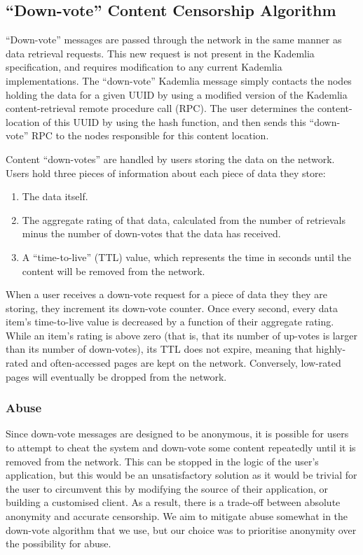 \subsection{``Down-vote'' Content Censorship Algorithm}

``Down-vote'' messages are passed through the network in the same manner as data retrieval requests. This new request is
not present in the Kademlia specification, and requires modification to any current Kademlia implementations.
The ``down-vote'' Kademlia message simply contacts the nodes holding the data for a given UUID by
using a modified version of the Kademlia content-retrieval remote procedure call (RPC). The user determines the
content-location of this UUID by using the hash function, and then sends this ``down-vote'' RPC to the nodes
responsible for this content location.

Content ``down-votes'' are handled by users storing the data on the network. Users hold three pieces of information about each piece of data they store:
\begin{enumerate}
    \item The data itself.
    \item The aggregate rating of that data, calculated from the number of retrievals minus the number of
    down-votes that the data has received.
    \item A ``time-to-live'' (TTL) value, which represents the time in seconds until the content will be removed from the network.
\end{enumerate}

When a user receives a down-vote request for a piece of data they they are storing, they increment its down-vote counter.
Once every second, every data item's time-to-live value is decreased by a function of their aggregate rating.
While an item's rating is above zero (that is, that its number of up-votes is larger than its number of down-votes),
its TTL does not expire, meaning that highly-rated and often-accessed pages are kept on the network.
Conversely, low-rated pages will eventually be dropped from the network.

\subsubsection{Abuse}

Since down-vote messages are designed to be anonymous, it is possible for users to attempt to cheat the system and
down-vote some content repeatedly until it is removed from the network. This can be stopped in the logic of the
user's application, but this would be an unsatisfactory solution as it would be trivial for the user to circumvent this by
modifying the source of their application, or building a customised client. As a result, there is a trade-off between absolute
anonymity and accurate censorship. We aim to mitigate abuse somewhat in the down-vote algorithm that we use, but our choice was 
to prioritise anonymity over the possibility for abuse.


